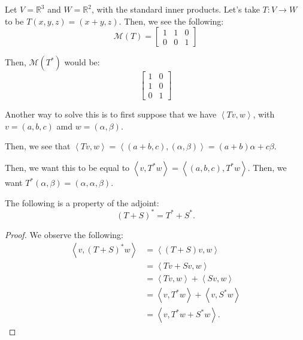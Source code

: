 \documentclass[openany]{book}
\newcommand{\RR}{\mathbb{R}}
\newcommand{\innerproduct}[2]{\left\langle{#1}, {#2}\right\rangle}
\begin{document}
	\begin{example}
		Let $V = \RR^{3}$ and $W = \RR^{2}$, with the standard inner products. Let's take $T: V \rightarrow W$ to be $T(x,y,z) = (x+y, z)$. Then, we see the following:
		\begin{equation*}
			\mathcal{M}(T) = \begin{bmatrix}
				1 & 1 & 0 \\
				0 & 0 & 1
			\end{bmatrix}
		\end{equation*}
	
		Then, $\mathcal{M}(T^{*})$ would be:
		\begin{equation*}
			\begin{bmatrix}
				1 & 0 \\ 1 & 0 \\ 0 & 1
			\end{bmatrix}
		\end{equation*}
	
		Another way to solve this is to first suppose that we have $\innerproduct{Tv}{w}$, with $v = (a,b,c)$ amd $w = (\alpha, \beta)$. 
		
		Then, we see that $\innerproduct{Tv}{w} = \innerproduct{(a+b, c)}{(\alpha, \beta)} = (a+b)\alpha + c\beta$.
		
		Then, we want this to be equal to $\innerproduct{v}{T^{*}w} = \innerproduct{(a,b,c)}{T^{*}w}$. Then, we want $T^{*}(\alpha, \beta) = (\alpha, \alpha, \beta)$.
	\end{example}

	\begin{thm}
		The following is a property of the adjoint:
		\begin{equation*}
			(T+S)^{*} = T^{*} + S^{*}.
		\end{equation*}
	\end{thm}
	\begin{proof}
		We observe the following:
		\begin{align*}
			\innerproduct{v}{(T+S)^{*}w} &= \innerproduct{(T+S)v}{w} \\
			&= \innerproduct{Tv + Sv}{w} \\
			&= \innerproduct{Tv}{w} + \innerproduct{Sv}{w} \\
			&= \innerproduct{v}{T^{*}w} + \innerproduct{v}{S^{*}w} \\
			&= \innerproduct{v}{T^{*}w + S^{*}w}.
		\end{align*}
	\end{proof}
\end{document}
